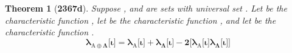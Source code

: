 \documentclass[preview]{standalone}
\newtheorem*{theorem*}{Theorem}
\begin{document}
\begin{theorem*}[\textbf{2367d}]
    Suppose , and \bm{$\Lambda$} are sets with universal set \bm{$\Omega$}. 
    Let  be the characteristic function 
    ,
    let  be the characteristic function 
    , 
    and let \bm{$\lambda_{\Lambda}$} be the characteristic function  
    . 
    \begin{equation*}
        \bm{
            \lambda_{\mathrm{A} \oplus \Lambda} \big[ \iota \big]
                = 
            \lambda_{\mathrm{A}} \big[ \iota \big] 
                + 
            \lambda_{\Lambda} \big[ \iota \big] 
                - 
            2 \Big[ \lambda_{\mathrm{A}} \big[ \iota \big] \lambda_{\Lambda} \big[ \iota \big] \Big]
        }
    \end{equation*}
\end{theorem*}
\end{document}
